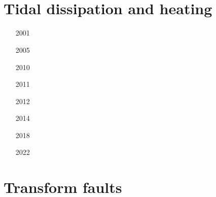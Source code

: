 \begin{small}
\begin{itemize}
\item[\nineteenninetynine] 
\item[\twothousand] 
\item[\twothousandeleven] 
\item[\twothousandthirteen]
\item[\twothousandsixteen] 
\item[\twothousandeighteen] 
\item[\twothousandtwentytwo] 
 \\
 \\
\item[\twothousandtwentythree]
\end{itemize}
\end{small}

\section{Tidal dissipation and heating} 

\begin{small}
\begin{itemize}
\item[2001]
\item[2005]
\item[2010]
\item[2011]
\item[2012]
\item[2014] 
\item[2018] 
\item[2022]
\end{itemize}
\end{small}

\section{Transform faults} 

